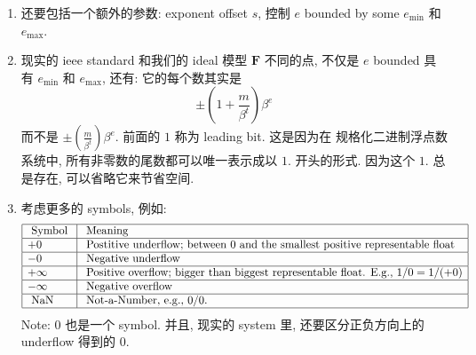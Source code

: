 \begin{enumerate}
    \item 还要包括一个额外的参数: exponent offset $s$, 控制 $e$ bounded by some $e_{\min}$ 和  $e_{\max}$.
    \item 现实的 ieee standard 和我们的 ideal 模型 $\mathbf{F}$ 不同的点, 不仅是 $e$ bounded 具有 $e_{\min}$ 和  $e_{\max}$, 还有: 它的每个数其实是  \[ \pm (1+\frac{m}{\beta^t})\beta^e\] 而不是 \(\pm (\frac{m}{\beta^t})\beta^e\). 前面的 $1$ 称为 leading bit. 这是因为在 规格化二进制浮点数系统中, 所有非零数的尾数都可以唯一表示成以 $1.$ 开头的形式. 因为这个 $1.$  总是存在, 可以省略它来节省空间.
    \item 考虑更多的 symbols, 例如: $$
\begin{array}{|l|l|}
\hline \text { Symbol } & \text { Meaning } \\
\hline+0 & \text { Postitive underflow; between } 0 \text { and the smallest positive representable float } \\
\hline-0 & \text { Negative underflow } \\
\hline+\infty & \text { Positive overflow; bigger than biggest representable float. E.g., } 1 / 0=1 /(+0) \\
\hline-\infty & \text { Negative overflow } \\
\hline \text { NaN } & \text { Not-a-Number, e.g., 0/0. } \\
\hline
\end{array}
$$ Note: $0$ 也是一个 symbol. 并且, 现实的 system 里, 还要区分正负方向上的 underflow 得到的 $0$.
\end{enumerate}




